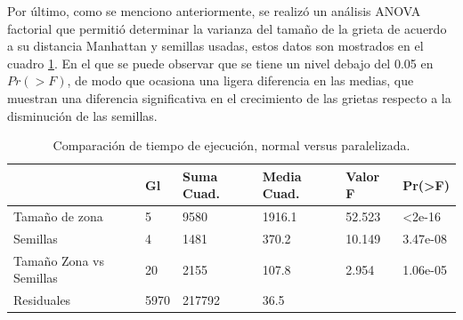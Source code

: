 \documentclass[12pt, letterpaper] {article}
\begin{document}
Por último, como se menciono anteriormente, se realizó un análisis ANOVA factorial que permitió determinar la varianza del tamaño de la grieta de acuerdo a su distancia Manhattan y semillas usadas, estos datos son mostrados en el cuadro \ref{datab}. En el que se puede observar que se tiene un nivel debajo del 0.05 en $Pr(>F)$, de modo que ocasiona una ligera diferencia en las medias, que muestran una diferencia significativa en el crecimiento de las grietas respecto a la disminución de las semillas.\vspace{-3mm}

\begin{table}[H]
\centering
\caption{Comparación de tiempo de ejecución, normal versus paralelizada.}
\label{datab}
\begin{tabular}{@{}|l|l|l|l|l|l|@{}}
\hline
\rowcolor[HTML]{ECF4FF} 
\multicolumn{1}{|c|}{\cellcolor[HTML]{ECF4FF}{\color[HTML]{333333} }} & {\color[HTML]{333333} Gl}    & {\color[HTML]{333333} Suma Cuad.} & {\color[HTML]{333333} Media Cuad.} & {\color[HTML]{333333} Valor F} & {\color[HTML]{333333} Pr(\textgreater{}F)} \\ \hline
\rowcolor[HTML]{EFEFEF} 
{\color[HTML]{333333} Tamaño de zona}                                 & {\color[HTML]{333333} 5}    & {\color[HTML]{333333} 9580}       & {\color[HTML]{333333} 1916.1}      & {\color[HTML]{333333} 52.523}  & {\color[HTML]{333333} \textless 2e-16}     \\ \hline
\rowcolor[HTML]{EFEFEF} 
{\color[HTML]{333333} Semillas}                                       & {\color[HTML]{333333} 4}    & {\color[HTML]{333333} 1481}       & {\color[HTML]{333333} 370.2}       & {\color[HTML]{333333} 10.149}  & {\color[HTML]{333333} 3.47e-08}            \\ \hline
\rowcolor[HTML]{EFEFEF} 
{\color[HTML]{333333} Tamaño Zona vs Semillas}                        & {\color[HTML]{333333} 20}   & {\color[HTML]{333333} 2155}       & {\color[HTML]{333333} 107.8}       & {\color[HTML]{333333} 2.954}   & {\color[HTML]{333333} 1.06e-05}            \\ \hline
\rowcolor[HTML]{EFEFEF} 
{\color[HTML]{333333} Residuales}                                     & {\color[HTML]{333333} 5970} & {\color[HTML]{333333} 217792}     & {\color[HTML]{333333} 36.5}        & {\color[HTML]{333333} }        & {\color[HTML]{333333} }                    \\ \hline
\end{tabular}
\end{table}\vspace{-10mm}






\end{document}
